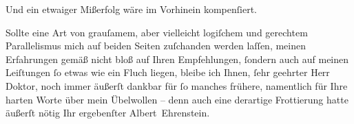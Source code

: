 \pstart
           {\pb}Und ein etwaiger Mißerfolg wäre im
               Vorhinein kompenſiert.\pend
           
\pstart
           Sollte eine Art von grauſamem, aber vielleicht logiſchem und gerechtem Parallelismus
               mich auf beiden Seiten zuſchanden werden laſſen, meinen Erfahrungen gemäß nicht bloß
               auf Ihren Empfehlungen, ſondern auch auf meinen Leiſtungen ſo etwas wie ein Fluch
               liegen, bleibe ich Ihnen, ſehr geehrter Herr Doktor, noch immer äußerſt dankbar für
               ſo manches frühere, namentlich für Ihre harten Worte über mein Übelwollen – denn auch
               eine derartige Frottierung hatte äußerſt nötig Ihr ergebenſter\pend
           \pstart \spacefill\mbox{Albert Ehrenstein.}\pend{}\endnumbering{}  
      